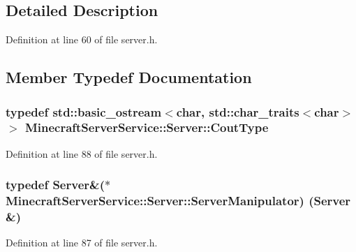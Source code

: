 \subsection{Detailed Description}


Definition at line 60 of file server.\+h.



\subsection{Member Typedef Documentation}
\subsubsection[{\texorpdfstring{Cout\+Type}{CoutType}}]{\setlength{\rightskip}{0pt plus 5cm}typedef std\+::basic\+\_\+ostream$<$char, std\+::char\+\_\+traits$<$char$>$ $>$ {\bf Minecraft\+Server\+Service\+::\+Server\+::\+Cout\+Type}}\hypertarget{class_minecraft_server_service_1_1_server_a9a78d018fb71e9aa0a054ff39cba5083}{}\label{class_minecraft_server_service_1_1_server_a9a78d018fb71e9aa0a054ff39cba5083}


Definition at line 88 of file server.\+h.

\subsubsection[{\texorpdfstring{Server\+Manipulator}{ServerManipulator}}]{\setlength{\rightskip}{0pt plus 5cm}typedef {\bf Server}\&($\ast$ Minecraft\+Server\+Service\+::\+Server\+::\+Server\+Manipulator) ({\bf Server} \&)}\hypertarget{class_minecraft_server_service_1_1_server_af07a3457e3239d898b8f84809b0703e4}{}\label{class_minecraft_server_service_1_1_server_af07a3457e3239d898b8f84809b0703e4}


Definition at line 87 of file server.\+h.

